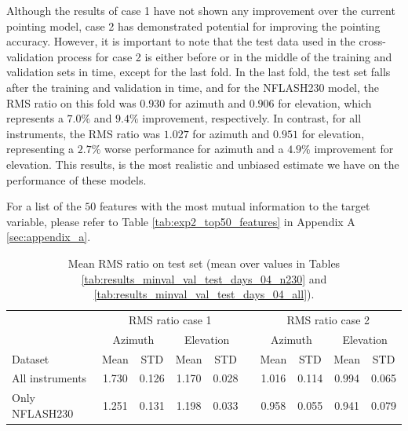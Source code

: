 Although the results of case 1 have not shown any improvement over the current pointing model, case 2 has demonstrated potential for improving the pointing accuracy.
However, it is important to note that the test data used in the cross-validation process for case 2 is either before or in the middle of the training and validation sets in time, except for the last fold.
In the last fold, the test set falls after the training and validation in time, and for the NFLASH230 model,
the RMS ratio on this fold was $0.930$ for azimuth and $0.906$ for elevation, which represents a $7.0\%$ and $9.4\%$ improvement, respectively.
In contrast, for all instruments, the RMS ratio was $1.027$ for azimuth and $0.951$ for elevation, representing a $2.7\%$ worse performance for azimuth and a $4.9\%$ improvement for elevation.
This results, is the most realistic and unbiased estimate we have on the performance of these models.

For a list of the $50$ features with the most mutual information to the target variable, please refer to Table \ref{tab:exp2_top50_features} in Appendix A \ref{sec:appendix_a}.

\begin{table}[!htbp]
    \centering
    \caption{Mean RMS ratio on test set (mean over values in Tables \ref{tab:results_minval_val_test_days_04_n230} and \ref{tab:results_minval_val_test_days_04_all}).}
    \begin{tabular}{lcccc c cccc}
        \toprule
        \multicolumn{1}{c}{} & \multicolumn{4}{c}{RMS ratio case 1} & & \multicolumn{4}{c}{RMS ratio case 2} \\
        \cmidrule(lr){2-5} \cmidrule(lr){7-10}
        \multicolumn{1}{c}{} & \multicolumn{2}{c}{Azimuth} & \multicolumn{2}{c}{Elevation} & & \multicolumn{2}{c}{Azimuth} & \multicolumn{2}{c}{Elevation} \\ 
        \cmidrule(lr){2-5} \cmidrule(lr){7-10}
        Dataset &  Mean &  STD &  Mean &  STD & & Mean &  STD &  Mean &  STD \\
        \midrule
        All instruments   &     1.730 &     0.126 &     1.170 &     0.028 &  &   1.016 &     0.114 &     0.994 &     0.065 \\
        Only NFLASH230    &     1.251 &     0.131 &     1.198 &     0.033 &  &   0.958 &     0.055 &     0.941 &     0.079 \\
        \bottomrule
    \end{tabular}
    \label{tab:results_minval_days04}
\end{table}




